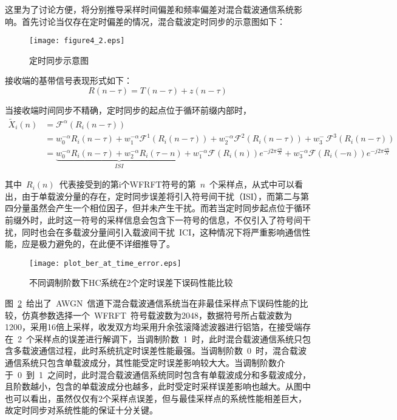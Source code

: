 这里为了讨论方便，将分别推导采样时间偏差和频率偏差对混合载波通信系统影响。首先讨论当仅存在定时偏差的情况，混合载波定时同步的示意图如下：
\begin{figure}[htbp]
\centering
\texttt{[image: figure4\_2.eps]}
\caption{定时同步示意图}\vspace{-1em}\label{dingshitongbuweizhi}
\end{figure}

接收端的基带信号表现形式如下：
\begin{equation}
R(n-\tau) = T(n-\tau) + z(n-\tau)
\end{equation}

当接收端时间同步不精确，定时同步的起点位于循环前缀内部时，
\begin{align}\label{huajianjieguo}
\tilde X_i(n) &= {\mathcal{F}^\alpha }\left ( R_i\left ( n-\tau \right ) \right ) \\
&= w_0^{- \alpha }R_i(n-\tau) + w_1^{- \alpha }{{\mathcal{F}^1}\left ( R_i\left ( n-\tau \right ) \right )}
+ w_2^{- \alpha }{{\mathcal{F}^2}\left ( R_i\left ( n-\tau \right ) \right )}
+ w_3^{- \ }{{\mathcal{F}^3}\left ( R_i\left ( n-\tau \right ) \right )} \\
&= \underbrace {w_0^{- \alpha }R_i(n-\tau) + w_2^{- \alpha }R_i(\tau -n)}_{ISI} + w_1^{- \alpha }{{\mathcal{F}}\left ( R_i\left ( n \right ) \right )} {e^{-j2\pi \frac{{\varepsilon n}}{N}}} + w_3^{- \alpha }{{\mathcal{F}}\left ( R_i\left ( -n \right ) \right )} {e^{-j2\pi \frac{{\varepsilon n}}{N}}}
\end{align}

其中~$R_i(n)$~代表接受到的第i个WFRFT符号的第~$n$~个采样点，从式中可以看出，由于单载波分量的存在，定时同步误差将引入符号间干扰（ISI），而第二与第四分量虽然会产生一个相位因子，但并未产生干扰。而若当定时同步起点位于循环前缀外时，此时这一符号的采样信息会包含下一符号的信息，不仅引入了符号间干扰，同时也会在多载波分量间引入载波间干扰~ICI，这种情况下将严重影响通信性能，应是极力避免的，在此便不详细推导了。
\begin{figure}[htbp]
\centering
\texttt{[image: plot\_ber\_at\_time\_error.eps]}
\caption{不同调制阶数下HC系统在2个定时误差下误码性能比较}\vspace{-1em}\label{plot_ber_at_time_error}
\end{figure}
图~\ref{plot_ber_at_time_error}~给出了~AWGN~信道下混合载波通信系统当在非最佳采样点下误码性能的比较，仿真参数选择一个~WFRFT~符号载波数为2048，数据符号所占载波数为1200，采用16倍上采样，收发双方均采用升余弦滚降滤波器进行铝箔，在接受端存在~2~个采样点的误差进行解调下，当调制阶数~1~时，此时混合载波通信系统只包含多载波通信过程，此时系统抗定时误差性能最强。当调制阶数~0~时，混合载波通信系统只包含单载波成分，其性能受定时误差影响较大大。当调制阶数介于~0~到~1~之间时，此时混合载波通信系统同时包含有单载波成分和多载波成分，且阶数越小，包含的单载波成分也越多，此时受定时采样误差影响也越大。从图中也可以看出，虽然仅仅有2个采样点误差，但与最佳采样点的系统性能相差巨大，故定时同步对系统性能的保证十分关键。

